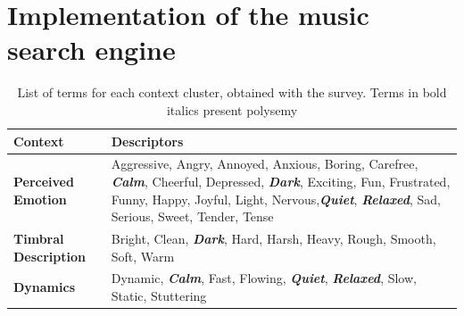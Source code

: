 

\section{Implementation of the music search engine}
\label{sec:DCSMapplication}



\begin{table}[tbp]
\caption{List of terms for each context cluster, obtained with the survey. Terms in bold italics present polysemy}
\label{tab:DCSMcontext}
\centering
\bgroup
\def\arraystretch{1.5}
\begin{tabular}{||p{}|p{}||}
\hline
\hline
Context & Descriptors\\
\hline
\hline
\bf{Perceived Emotion} & Aggressive, Angry, Annoyed, Anxious, Boring, Carefree, \textbf{\textit{Calm}}, Cheerful, Depressed, \textit{\textbf{Dark}}, 
Exciting, Fun, Frustrated, Funny, Happy, Joyful, Light, Nervous,\textit{\textbf{Quiet}}, \textbf{\textit{Relaxed}},  Sad, Serious, Sweet, Tender, Tense\\
\hline
\bf{Timbral Description} & Bright, Clean, \textit{\textbf{Dark}}, Hard, Harsh, Heavy, Rough, Smooth, Soft, Warm \\
\hline
\bf{Dynamics} & Dynamic, \textbf{\textit{Calm}}, Fast, Flowing, \textit{\textbf{Quiet}}, \textbf{\textit{Relaxed}}, Slow, Static, Stuttering\\
\hline
\hline
\end{tabular}
\egroup
\end{table}


